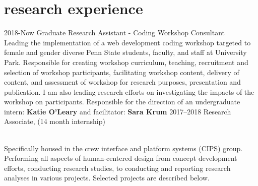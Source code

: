 \documentclass[]{cv-style}          %
\begin{document}
\section{research experience}
\vspace{-0.2cm}
\begin{entrylist}
\entry
  {2018-Now}
  {Graduate Research Assistant - Coding Workshop Consultant}
  {}
  {\\
  Leading the implementation of a web development coding workshop targeted to female and gender diverse Penn State students, faculty, and staff at University Park. Responsible for creating workshop curriculum, teaching, recruitment and selection of workshop participants, facilitating workshop content, delivery of content, and assessment of workshop for research purposes, presentation and publication. I am also leading research efforts on investigating the impacts of the workshop on participants. Responsible for the direction of an undergraduate intern: \textbf{Katie O'Leary} and facilitator: \textbf{Sara Krum} }
\entry
  {2017--2018}
  {Research Associate, (14 month internship)}
  {}
  {\\ 
  Specifically housed in the crew interface and platform systems (CIPS) group. Performing all aspects of human-centered design from concept development efforts, conducting research studies, to conducting and reporting research analyses in various projects. Selected projects are described below.

}
\end{entrylist}
\end{document}
